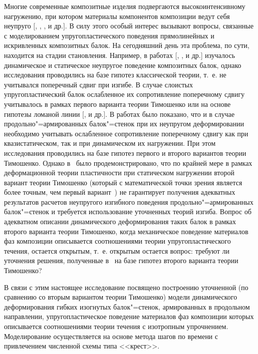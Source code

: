 Многие современные композитные изделия подвергаются высокоинтенсивному
нагружению, при котором материалы компонентов композиции ведут себя неупруго
[, , ,  и др.]. 
В силу этого особый интерес вызывают вопросы,
связанные с моделированием упругопластического поведения прямолинейных и
искривленных композитных балок. На сегодняшний день эта проблема, по сути,
находится на стадии становления. Например, в работах [, ,  и др.]
изучалось динамическое и статическое неупругое поведение композитных балок,
однако исследования проводились на базе гипотез классической теории, т.~е. не
учитывался поперечный сдвиг при изгибе. В случае слоистых упругопластический
балок ослабленное их сопротивление поперечному сдвигу учитывалось в рамках
первого варианта теории Тимошенко или на основе гипотезы ломаной линии [,  и др.]. В работах \cite{yank:bib13,yank:bib16} было показано, что и в случае
продольно"=армированных балок"=стенок при их неупругом деформировании
необходимо учитывать ослабленное сопротивление поперечному сдвигу как при
квазистатическом, так и при динамическом их нагружении. При этом
исследования проводились на базе гипотез первого и второго вариантов теории
Тимошенко. Однако в~\cite{yank:bib14} было продемонстрировано, что по крайней мере в
рамках деформационной теории пластичности при статическом нагружении второй
вариант теории Тимошенко (который с математической точки зрения является
более точным, чем первый вариант~\cite{yank:bib13}) не гарантирует получения адекватных
результатов расчетов неупругого изгибного поведения продольно"=армированных
балок"=стенок и требуется использование уточненных теорий изгиба. Вопрос об
адекватном описании динамического деформирования таких балок в рамках
второго варианта теории Тимошенко, когда механическое поведение материалов
фаз композиции описывается соотношениями теории упругопластического течения,
остается открытым, т.~е. открытым остается вопрос: требуют ли уточнения
решения, полученные в~\cite{yank:bib13} на базе гипотез второго варианта теории
Тимошенко?

В связи с этим настоящее исследование посвящено построению уточненной (по
сравнению со вторым вариантом теории Тимошенко) модели динамического
деформирования гибких изогнутых балок"=стенок, армированных в продольном
направлении, упругопластическое поведение материалов фаз композиции которых
описывается соотношениями теории течения с изотропным упрочнением.
Моделирование осуществляется на основе метода шагов по времени с
привлечением численной схемы типа <<крест>>.

